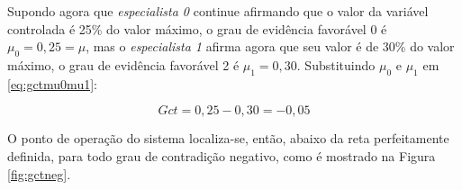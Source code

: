 \begin{itemize}
Supondo agora que 
\emph{especialista 0} continue afirmando  que 
o valor da variável controlada é 25\% do valor máximo,
o grau de evidência favorável 0 é $\mu_0 = 0,25 = \mu$, 
mas o \emph{especialista 1} afirma agora que
seu valor é de 30\% do valor máximo,
o grau de evidência favorável 2 é $\mu_1 = 0,30$.
Substituindo $\mu_0$ e $\mu_1$ em \ref{eq:gctmu0mu1}:



\begin{equation}%
Gct = 0,25 - 0,30 = -0,05
\end{equation}%



O ponto de operação do sistema 
localiza-se, então, abaixo da reta perfeitamente definida,
para todo grau de contradição negativo,
como é mostrado na Figura \ref{fig:gctneg}.




\end{itemize}




